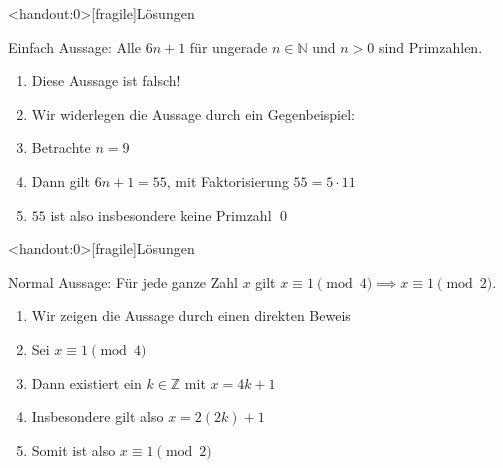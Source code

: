 {
\begin{frame}<handout:0>[fragile]{Lösungen}   
    \begin{block}{Einfach}
        Aussage: Alle $6n+1$ für ungerade $n \in \mathbb{N}$ und $n > 0$ sind Primzahlen.
        \begin{enumerate}
            \item<1-> Diese Aussage ist falsch!
            \item<2-> Wir widerlegen die Aussage durch ein Gegenbeispiel:
            \item<3-> Betrachte $n = 9$
            \item<4-> Dann gilt $6n+1 = 55$, mit Faktorisierung $55 = 5 \cdot 11$
            \item<5-> $55$ ist also insbesondere keine Primzahl \qed
        \end{enumerate}
    \end{block}
\end{frame}
}

{
\begin{frame}<handout:0>[fragile]{Lösungen}   
    \begin{block}{Normal}
        Aussage: Für jede ganze Zahl $x$ gilt $x\equiv 1\pmod 4 \implies x\equiv 1\pmod 2$.
        \begin{enumerate}
            \item<2-> Wir zeigen die Aussage durch einen direkten Beweis 
            \item<3-> Sei $x \equiv 1 \pmod{4}$
            \item<4-> Dann existiert ein $k \in \mathbb{Z}$ mit $x = 4k + 1$
            \item<5-> Insbesondere gilt also $x = 2(2k)+1$
            \item<6-> Somit ist also $x \equiv 1 \pmod{2}$
        \end{enumerate}
    \end{block}
\end{frame}
}

